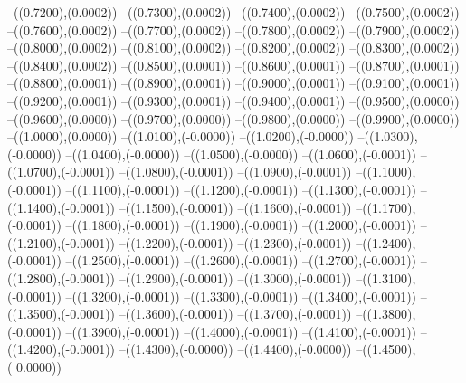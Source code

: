 {	--({\sx*(0.7200)},{\sy*(0.0002)})
	--({\sx*(0.7300)},{\sy*(0.0002)})
	--({\sx*(0.7400)},{\sy*(0.0002)})
	--({\sx*(0.7500)},{\sy*(0.0002)})
	--({\sx*(0.7600)},{\sy*(0.0002)})
	--({\sx*(0.7700)},{\sy*(0.0002)})
	--({\sx*(0.7800)},{\sy*(0.0002)})
	--({\sx*(0.7900)},{\sy*(0.0002)})
	--({\sx*(0.8000)},{\sy*(0.0002)})
	--({\sx*(0.8100)},{\sy*(0.0002)})
	--({\sx*(0.8200)},{\sy*(0.0002)})
	--({\sx*(0.8300)},{\sy*(0.0002)})
	--({\sx*(0.8400)},{\sy*(0.0002)})
	--({\sx*(0.8500)},{\sy*(0.0001)})
	--({\sx*(0.8600)},{\sy*(0.0001)})
	--({\sx*(0.8700)},{\sy*(0.0001)})
	--({\sx*(0.8800)},{\sy*(0.0001)})
	--({\sx*(0.8900)},{\sy*(0.0001)})
	--({\sx*(0.9000)},{\sy*(0.0001)})
	--({\sx*(0.9100)},{\sy*(0.0001)})
	--({\sx*(0.9200)},{\sy*(0.0001)})
	--({\sx*(0.9300)},{\sy*(0.0001)})
	--({\sx*(0.9400)},{\sy*(0.0001)})
	--({\sx*(0.9500)},{\sy*(0.0000)})
	--({\sx*(0.9600)},{\sy*(0.0000)})
	--({\sx*(0.9700)},{\sy*(0.0000)})
	--({\sx*(0.9800)},{\sy*(0.0000)})
	--({\sx*(0.9900)},{\sy*(0.0000)})
	--({\sx*(1.0000)},{\sy*(0.0000)})
	--({\sx*(1.0100)},{\sy*(-0.0000)})
	--({\sx*(1.0200)},{\sy*(-0.0000)})
	--({\sx*(1.0300)},{\sy*(-0.0000)})
	--({\sx*(1.0400)},{\sy*(-0.0000)})
	--({\sx*(1.0500)},{\sy*(-0.0000)})
	--({\sx*(1.0600)},{\sy*(-0.0001)})
	--({\sx*(1.0700)},{\sy*(-0.0001)})
	--({\sx*(1.0800)},{\sy*(-0.0001)})
	--({\sx*(1.0900)},{\sy*(-0.0001)})
	--({\sx*(1.1000)},{\sy*(-0.0001)})
	--({\sx*(1.1100)},{\sy*(-0.0001)})
	--({\sx*(1.1200)},{\sy*(-0.0001)})
	--({\sx*(1.1300)},{\sy*(-0.0001)})
	--({\sx*(1.1400)},{\sy*(-0.0001)})
	--({\sx*(1.1500)},{\sy*(-0.0001)})
	--({\sx*(1.1600)},{\sy*(-0.0001)})
	--({\sx*(1.1700)},{\sy*(-0.0001)})
	--({\sx*(1.1800)},{\sy*(-0.0001)})
	--({\sx*(1.1900)},{\sy*(-0.0001)})
	--({\sx*(1.2000)},{\sy*(-0.0001)})
	--({\sx*(1.2100)},{\sy*(-0.0001)})
	--({\sx*(1.2200)},{\sy*(-0.0001)})
	--({\sx*(1.2300)},{\sy*(-0.0001)})
	--({\sx*(1.2400)},{\sy*(-0.0001)})
	--({\sx*(1.2500)},{\sy*(-0.0001)})
	--({\sx*(1.2600)},{\sy*(-0.0001)})
	--({\sx*(1.2700)},{\sy*(-0.0001)})
	--({\sx*(1.2800)},{\sy*(-0.0001)})
	--({\sx*(1.2900)},{\sy*(-0.0001)})
	--({\sx*(1.3000)},{\sy*(-0.0001)})
	--({\sx*(1.3100)},{\sy*(-0.0001)})
	--({\sx*(1.3200)},{\sy*(-0.0001)})
	--({\sx*(1.3300)},{\sy*(-0.0001)})
	--({\sx*(1.3400)},{\sy*(-0.0001)})
	--({\sx*(1.3500)},{\sy*(-0.0001)})
	--({\sx*(1.3600)},{\sy*(-0.0001)})
	--({\sx*(1.3700)},{\sy*(-0.0001)})
	--({\sx*(1.3800)},{\sy*(-0.0001)})
	--({\sx*(1.3900)},{\sy*(-0.0001)})
	--({\sx*(1.4000)},{\sy*(-0.0001)})
	--({\sx*(1.4100)},{\sy*(-0.0001)})
	--({\sx*(1.4200)},{\sy*(-0.0001)})
	--({\sx*(1.4300)},{\sy*(-0.0000)})
	--({\sx*(1.4400)},{\sy*(-0.0000)})
	--({\sx*(1.4500)},{\sy*(-0.0000)})
}
